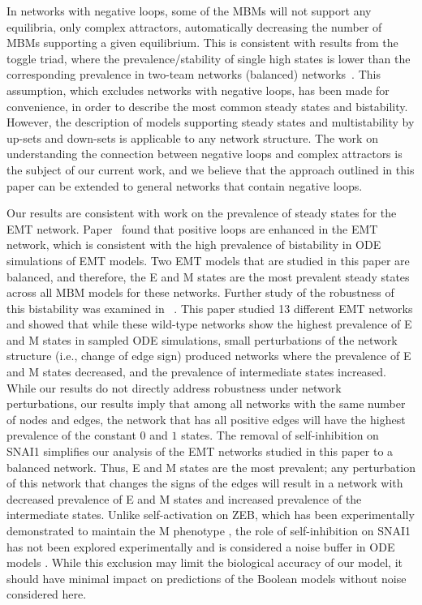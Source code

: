 \documentclass[10pt,letterpaper]{article}
\newcommand{\boolf}{{\mathfrak 0}}
\newcommand{\boolt}{{\mathfrak 1}}
\begin{document}
In networks with negative loops, some of the MBMs will not support any equilibria, only complex attractors, automatically decreasing the number of MBMs supporting a given equilibrium. This is consistent with results from the toggle triad, where the prevalence/stability of single high states is lower than the corresponding prevalence in two-team networks (balanced) networks~\cite{duddu_multi-stability_2020}.
 This assumption, which excludes networks with negative loops, has been made for convenience, in order to describe the most common steady states and bistability. However, the description of models supporting steady states and multistability by up-sets and down-sets is applicable to any network structure. The work on understanding the connection between negative loops and complex attractors is the subject of our current work, and we believe that the approach outlined in this paper can be extended to general networks that contain negative loops. 

Our results are consistent with work on the prevalence of steady states for the EMT network. Paper~\cite{nordick_identification_2021} found that positive loops are enhanced in the EMT network, which is consistent with the high prevalence of bistability in ODE simulations of EMT models. Two EMT models that are studied in this paper are balanced, and therefore, the E and M states are the most prevalent steady states across all MBM models for these networks. 
Further study of the robustness of this bistability was examined in ~\cite{rashid_network_2022}. This paper studied 13 different EMT networks and showed that while these wild-type networks show the highest prevalence of E and M states in sampled ODE simulations, small perturbations of the network structure (i.e., change of edge sign) produced networks where the prevalence of E and M states decreased, and the prevalence of intermediate states increased. While our results do not directly address robustness under network perturbations, our results imply that among all networks with the same number of nodes and edges, the network that has all positive edges will have the highest prevalence of the constant $\boolf$ and $\boolt$ states. The removal of self-inhibition on SNAI1 simplifies our analysis of the EMT networks studied in this paper to a balanced network. Thus, E and M states are the most prevalent; any perturbation of this network that changes the signs of the edges will result in a network with decreased prevalence of E and M states and increased prevalence of the intermediate states. Unlike self-activation on ZEB, which has been experimentally demonstrated to maintain the M phenotype \cite{preca_self-enforcing_2015}, the role of self-inhibition on SNAI1 has not been explored experimentally and is considered a noise buffer in ODE models \cite{lu_microrna-based_2013}. While this exclusion may limit the biological accuracy of our model, it should have minimal impact on predictions of the Boolean models without noise considered here.
\end{document}
